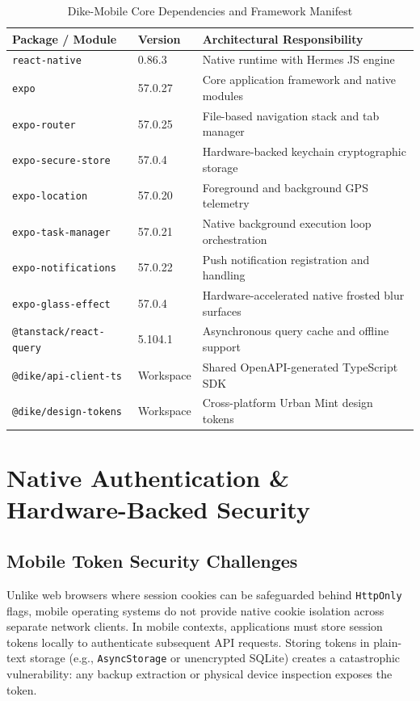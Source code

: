 \documentclass[conference,10pt,a4paper]{IEEEtran}
\begin{document}
\begin{table}[!ht]
\caption{Dike-Mobile Core Dependencies and Framework Manifest}
\label{tab:mobile_deps}
\centering
\scriptsize
\begin{tabularx}{\columnwidth}{p{3.0cm}p{1.4cm}X}
\toprule
\textbf{Package / Module} & \textbf{Version} & \textbf{Architectural Responsibility} \\
\midrule
\texttt{react-native} & 0.86.3 & Native runtime with Hermes JS engine \\
\texttt{expo} & 57.0.27 & Core application framework and native modules \\
\texttt{expo-router} & 57.0.25 & File-based navigation stack and tab manager \\
\texttt{expo-secure-store} & 57.0.4 & Hardware-backed keychain cryptographic storage \\
\texttt{expo-location} & 57.0.20 & Foreground and background GPS telemetry \\
\texttt{expo-task-manager} & 57.0.21 & Native background execution loop orchestration \\
\texttt{expo-notifications} & 57.0.22 & Push notification registration and handling \\
\texttt{expo-glass-effect} & 57.0.4 & Hardware-accelerated native frosted blur surfaces \\
\texttt{@tanstack/react-query} & 5.104.1 & Asynchronous query cache and offline support \\
\texttt{@dike/api-client-ts} & Workspace & Shared OpenAPI-generated TypeScript SDK \\
\texttt{@dike/design-tokens} & Workspace & Cross-platform Urban Mint design tokens \\
\bottomrule
\end{tabularx}
\end{table}

\section{Native Authentication \& Hardware-Backed Security}

\subsection{Mobile Token Security Challenges}
Unlike web browsers where session cookies can be safeguarded behind \texttt{HttpOnly} flags, mobile operating systems do not provide native cookie isolation across separate network clients. In mobile contexts, applications must store session tokens locally to authenticate subsequent API requests. Storing tokens in plain-text storage (e.g., \texttt{AsyncStorage} or unencrypted SQLite) creates a catastrophic vulnerability: any backup extraction or physical device inspection exposes the token.
\end{document}
